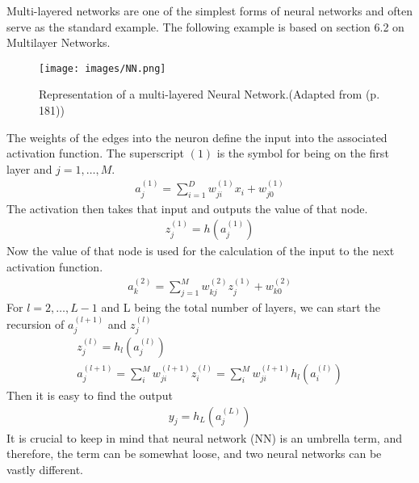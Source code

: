 \documentclass[a4paper,12pt]{article}
\begin{document}
Multi-layered networks are one of the simplest forms of neural networks and often serve as the standard example. The following example is based on \cite{bishop2024deep} section 6.2 on Multilayer Networks.
\begin{figure}[H]
\centering
\texttt{[image: images/NN.png]}
\caption{Representation of a multi-layered Neural Network.(Adapted from \cite{bishop2024deep} (p. 181)) } %
\label{fig:n2}
\end{figure}
The weights of the edges into the neuron define the input into the associated activation function. The superscript $(1)$ is the symbol for being on the first layer and $j=1,\dots, M$.
\begin{align}
a^{(1)}_j = \sum_{i=1}^{D} w^{(1)}_{ji} x_i + w^{(1)}_{j0}
\end{align}
The activation then takes that input and outputs the value of that node.
\begin{align}
z_j^{(1)} = h\left(a_j^{(1)}\right)
\end{align}
Now the value of that node is used for the calculation of the input to the next activation function.
\begin{align}
a_k^{(2)} = \sum_{j=1}^{M} w_{kj}^{(2)} z_j^{(1)} + w_{k0}^{(2)}
\end{align}
For $l=2,\dots,L-1$ and L being the total number of layers, we can start the recursion of $a_j^{(l+1)}$ and $z_j^{(l)} $
\begin{align}
z_j^{(l)} = h_l\left(a_j^{(l)}\right) \\
a_j^{(l+1)} = \sum_i^M w_{ji}^{(l+1)} z_i^{(l)} = \sum_i^M w_{ji}^{(l+1)} h_l\left(a_i^{(l)}\right)
\end{align}
Then it is easy to find the output
\begin{align}
y_j = h_L\left(a_j^{(L)}\right)
\end{align}
It is crucial to keep in mind that neural network (NN) is an umbrella term, and therefore, the term can be somewhat loose, and two neural networks can be vastly different.
\end{document}
